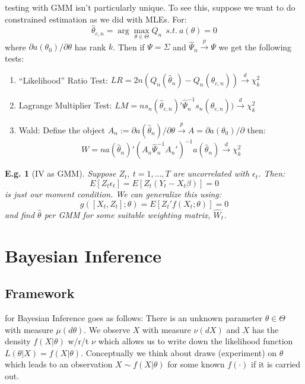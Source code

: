 \documentclass{tufte-book}
\theoremstyle{mytheoremstyle}
\theoremstyle{mylemstyle}
\theoremstyle{mydefstyle}
\newtheorem*{ex}{E.g.}
\begin{document}
 testing with GMM isn't particularly unique. To see this, suppose we want to do constrained estimation as we did with MLEs. For:
	\[\hat{\theta}_{c, n} = \arg \max_{\theta \in \Theta} Q_n\ \ s.t.\ a(\theta) = 0\]
where \(\partial a(\theta_0)/\partial \theta\) has rank \(k\). Then if \(\Psi = \Sigma\) and \(\hat{\Psi}_n \overset{p}{\rightarrow} \Psi\) we get the following tests: \begin{enumerate}
	\item ``Likelihood'' Ratio Test: \(LR = 2n(Q_n(\hat{\theta}_n) - Q_n(\hat{\theta}_{c, n})) \overset{d}{\rightarrow} \chi^2_k\)
	\item Lagrange Multiplier Test: \(LM=n s_n(\hat{\theta}_{c,n})' \hat{\Psi}_n^{-1} s_n(\hat{\theta}_{c,n}))\overset{d}{\rightarrow} \chi^2_k\)
	\item Wald: Define the object \(A_n := \partial a(\hat{\theta}_n)/\partial \theta \overset{p}{\rightarrow} A = \partial a(\theta_0)/\partial\) then:
		\[W = n a(\hat{\theta}_n)'(A_n \hat{\Psi}_n^{-1}A_n')^{-1}a(\hat{\theta}_n) \overset{d}{\rightarrow} \chi^2_k \]
\end{enumerate}

\begin{ex}[IV as GMM] Suppose \(Z_t,\ t=1, \dots, T\) are uncorrelated with \(\epsilon_t\). Then:
	\[E[Z_t \epsilon_t] = E[Z_t(Y_t - X_t\beta)] = 0\]
is just our moment condition. We can generalize this using:
	\[g([X_t, Z_t]; \theta) = E[Z_t'f(X_t; \theta)] = 0\]
and find \(\hat{\theta}\) per GMM for some suitable weighting matrix, \(\hat{W}_t\). \end{ex}

\chapter{Bayesian Inference} 

\section{Framework}
 for Bayesian Inference goes as follows: There is an unknown parameter \(\theta \in \Theta\) with measure \(\mu(d\theta)\). We observe \(X\) with measure \(\nu(dX)\) and \(X\) has the density \(f(X|\theta)\) w/r/t \(\nu\) which allows us to write down the likelihood function \(L(\theta | X) = f(X|\theta)\). Conceptually we think about draws (experiment) on \(\theta\) which leads to an observation \(X \sim f(X|\theta)\) for some known \(f(\cdot)\) if it is carried out. 
\end{document}
